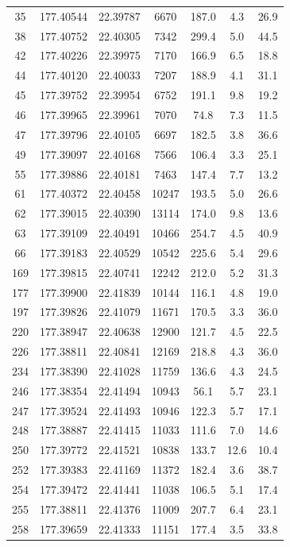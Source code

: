 \documentclass{aa}
\begin{document}
\begin{appendix}
\begin{longtable}{c c c c c c c}
35 & 177.40544 & 22.39787 & 6670 & 187.0 & 4.3 & 26.9 \\
38 & 177.40752 & 22.40305 & 7342 & 299.4 & 5.0 & 44.5 \\
42 & 177.40226 & 22.39975 & 7170 & 166.9 & 6.5 & 18.8 \\
44 & 177.40120 & 22.40033 & 7207 & 188.9 & 4.1 & 31.1 \\
45 & 177.39752 & 22.39954 & 6752 & 191.1 & 9.8 & 19.2 \\
46 & 177.39965 & 22.39961 & 7070 & 74.8 & 7.3 & 11.5 \\
47 & 177.39796 & 22.40105 & 6697 & 182.5 & 3.8 & 36.6 \\
49 & 177.39097 & 22.40168 & 7566 & 106.4 & 3.3 & 25.1 \\
55 & 177.39886 & 22.40181 & 7463 & 147.4 & 7.7 & 13.2 \\
61 & 177.40372 & 22.40458 & 10247 & 193.5 & 5.0 & 26.6 \\
62 & 177.39015 & 22.40390 & 13114 & 174.0 & 9.8 & 13.6 \\
63 & 177.39109 & 22.40491 & 10466 & 254.7 & 4.5 & 40.9 \\
66 & 177.39183 & 22.40529 & 10542 & 225.6 & 5.4 & 29.6 \\
169 & 177.39815 & 22.40741 & 12242 & 212.0 & 5.2 & 31.3 \\
177 & 177.39900 & 22.41839 & 10144 & 116.1 & 4.8 & 19.0 \\
197 & 177.39826 & 22.41079 & 11671 & 170.5 & 3.3 & 36.0 \\
220 & 177.38947 & 22.40638 & 12900 & 121.7 & 4.5 & 22.5 \\
226 & 177.38811 & 22.40841 & 12169 & 218.8 & 4.3 & 36.0 \\
234 & 177.38390 & 22.41028 & 11759 & 136.6 & 4.3 & 24.5 \\
246 & 177.38354 & 22.41494 & 10943 & 56.1 & 5.7 & 23.1 \\
247 & 177.39524 & 22.41493 & 10946 & 122.3 & 5.7 & 17.1 \\
248 & 177.38887 & 22.41415 & 11033 & 111.6 & 7.0 & 14.6 \\
250 & 177.39772 & 22.41521 & 10838 & 133.7 & 12.6 & 10.4 \\
252 & 177.39383 & 22.41169 & 11372 & 182.4 & 3.6 & 38.7 \\
254 & 177.39472 & 22.41441 & 11038 & 106.5 & 5.1 & 17.4 \\
255 & 177.38811 & 22.41376 & 11009 & 207.7 & 6.4 & 23.1 \\
258 & 177.39659 & 22.41333 & 11151 & 177.4 & 3.5 & 33.8 \\

\end{longtable}
\end{appendix}
\end{document}
